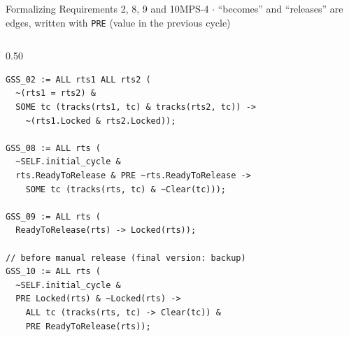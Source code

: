 \documentclass[aspectratio=169,10pt]{beamer}
\begin{document}
\begin{frame}[fragile]{Formalizing Requirements 2, 8, 9 and 10}{MPS-4 $\cdot$ ``becomes'' and ``releases'' are edges, written with \texttt{PRE} (value in the previous cycle)}
  \begin{columns}[T]
    \begin{column}{0.50\textwidth}
      \begin{codebox}
\begin{lstlisting}
GSS_02 := ALL rts1 ALL rts2 (
  ~(rts1 = rts2) &
  SOME tc (tracks(rts1, tc) & tracks(rts2, tc)) ->
    ~(rts1.Locked & rts2.Locked));

GSS_08 := ALL rts (
  ~SELF.initial_cycle &
  rts.ReadyToRelease & PRE ~rts.ReadyToRelease ->
    SOME tc (tracks(rts, tc) & ~Clear(tc)));

GSS_09 := ALL rts (
  ReadyToRelease(rts) -> Locked(rts));

// before manual release (final version: backup)
GSS_10 := ALL rts (
  ~SELF.initial_cycle &
  PRE Locked(rts) & ~Locked(rts) ->
    ALL tc (tracks(rts, tc) -> Clear(tc)) &
    PRE ReadyToRelease(rts));
\end{lstlisting}
      \end{codebox}
    \end{column}


\end{columns}
\end{frame}
\end{document}
